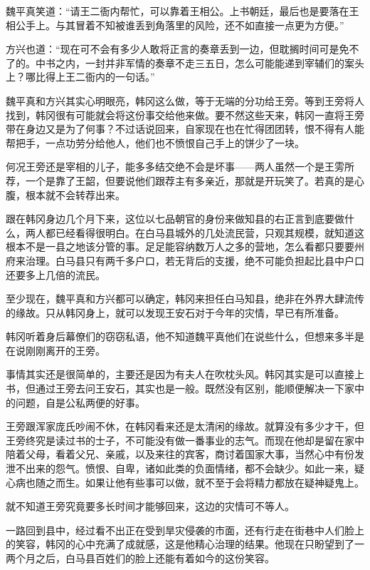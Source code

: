 魏平真笑道：“请王二衙内帮忙，可以靠着王相公。上书朝廷，最后也是要落在王相公手上。与其冒着不知被谁丢到角落里的风险，还不如直接一点更为方便。”

方兴也道：“现在可不会有多少人敢将正言的奏章丢到一边，但耽搁时间可是免不了的。中书之内，一封并非军情的奏章不走三五日，怎么可能能递到宰辅们的案头上？哪比得上王二衙内的一句话。”

魏平真和方兴其实心明眼亮，韩冈这么做，等于无端的分功给王旁。等到王旁将人找到，韩冈很有可能就会将这份事交给他来做。要不然这些天来，韩冈一直将王旁带在身边又是为了何事？不过话说回来，自家现在也在忙得团团转，恨不得有人能帮把手，一点功劳分给他人，他们也不愤恨自己手上的饼少了一块。

何况王旁还是宰相的儿子，能多多结交绝不会是坏事——两人虽然一个是王雱所荐，一个是靠了王韶，但要说他们跟荐主有多亲近，那就是开玩笑了。若真的是心腹，根本就不会转荐出来。

跟在韩冈身边几个月下来，这位以七品朝官的身份来做知县的右正言到底要做什么，两人都已经看得很明白。在白马县城外的几处流民营，只观其规模，就知道这根本不是一县之地该分管的事。足足能容纳数万人之多的营地，怎么看都只要要州府来治理。白马县只有两千多户口，若无背后的支援，绝不可能负担起比县中户口还要多上几倍的流民。

至少现在，魏平真和方兴都可以确定，韩冈来担任白马知县，绝非在外界大肆流传的缘故。只从韩冈身上，就可以发现王安石对于今年的灾情，早已有所准备。

韩冈听着身后幕僚们的窃窃私语，他不知道魏平真他们在说些什么，但想来多半是在说刚刚离开的王旁。

事情其实还是很简单的，主要还是因为有夫人在吹枕头风。韩冈其实是可以直接上书，但通过王旁去问王安石，其实也是一般。既然没有区别，能顺便解决一下家中的问题，自是公私两便的好事。

王旁跟浑家庞氏吵闹不休，在韩冈看来还是太清闲的缘故。就算没有多少才干，但王旁终究是读过书的士子，不可能没有做一番事业的志气。而现在他却是留在家中陪着父母，看着父兄、亲戚，以及来往的宾客，商讨着国家大事，当然心中有份发泄不出来的怨气。愤恨、自卑，诸如此类的负面情绪，都不会缺少。如此一来，疑心病也随之而生。如果让他有些事可以做，就不至于会将精力都放在疑神疑鬼上。

就不知道王旁究竟要多长时间才能够回来，这边的灾情可不等人。

一路回到县中，经过看不出正在受到旱灾侵袭的市面，还有行走在街巷中人们脸上的笑容，韩冈的心中充满了成就感，这是他精心治理的结果。他现在只盼望到了一两个月之后，白马县百姓们的脸上还能有着如今的这份笑容。


